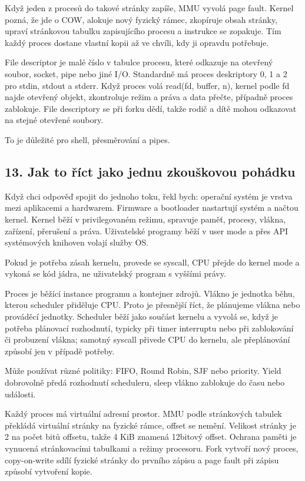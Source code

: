 \documentclass[11pt,a4paper]{article}
\begin{document}
Když jeden z procesů do takové stránky zapíše, MMU vyvolá page fault. Kernel pozná, že jde o COW, alokuje nový fyzický rámec, zkopíruje obsah stránky, upraví stránkovou tabulku zapisujícího procesu a instrukce se zopakuje. Tím každý proces dostane vlastní kopii až ve chvíli, kdy ji opravdu potřebuje.

File descriptor je malé číslo v tabulce procesu, které odkazuje na otevřený soubor, socket, pipe nebo jiné I/O. Standardně má proces deskriptory 0, 1 a 2 pro stdin, stdout a stderr. Když proces volá read(fd, buffer, n), kernel podle fd najde otevřený objekt, zkontroluje režim a práva a data přečte, případně proces zablokuje. File descriptory se při forku dědí, takže rodič a dítě mohou odkazovat na stejné otevřené soubory.

To je důležité pro shell, přesměrování a pipes.

\subsection*{13. Jak to říct jako jednu zkouškovou pohádku}

Když chci odpověď spojit do jednoho toku, řekl bych: operační systém je vrstva mezi aplikacemi a hardwarem. Firmware a bootloader nastartují systém a načtou kernel. Kernel běží v privilegovaném režimu, spravuje paměť, procesy, vlákna, zařízení, přerušení a práva. Uživatelské programy běží v user mode a přes API systémových knihoven volají služby OS.

Pokud je potřeba zásah kernelu, provede se syscall, CPU přejde do kernel mode a vykoná se kód jádra, ne uživatelský program s vyššími právy.

Proces je běžící instance programu a kontejner zdrojů. Vlákno je jednotka běhu, kterou scheduler přiděluje CPU. Proto je přesnější říct, že plánujeme vlákna nebo prováděcí jednotky. Scheduler běží jako součást kernelu a vyvolá se, když je potřeba plánovací rozhodnutí, typicky při timer interruptu nebo při zablokování či probuzení vlákna; samotný syscall přivede CPU do kernelu, ale přeplánování způsobí jen v případě potřeby.

Může používat různé politiky: FIFO, Round Robin, SJF nebo priority. Yield dobrovolně předá rozhodnutí scheduleru, sleep vlákno zablokuje do času nebo události.

Každý proces má virtuální adresní prostor. MMU podle stránkových tabulek překládá virtuální stránky na fyzické rámce, offset se nemění. Velikost stránky je 2 na počet bitů offsetu, takže 4 KiB znamená 12bitový offset. Ochrana paměti je vynucená stránkovacími tabulkami a režimy procesoru. Fork vytvoří nový proces, copy-on-write sdílí fyzické stránky do prvního zápisu a page fault při zápisu způsobí vytvoření kopie.
\end{document}
